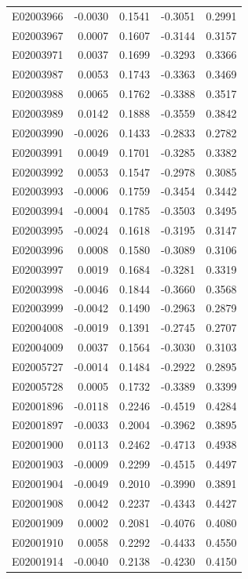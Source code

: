 \documentclass[11pt, a4paper]{article}
\begin{document}
\begin{longtable}{lrrrr}
E02003966 & -0.0030 & 0.1541 & -0.3051 & 0.2991 \\
E02003967 & 0.0007 & 0.1607 & -0.3144 & 0.3157 \\
E02003971 & 0.0037 & 0.1699 & -0.3293 & 0.3366 \\
E02003987 & 0.0053 & 0.1743 & -0.3363 & 0.3469 \\
E02003988 & 0.0065 & 0.1762 & -0.3388 & 0.3517 \\
E02003989 & 0.0142 & 0.1888 & -0.3559 & 0.3842 \\
E02003990 & -0.0026 & 0.1433 & -0.2833 & 0.2782 \\
E02003991 & 0.0049 & 0.1701 & -0.3285 & 0.3382 \\
E02003992 & 0.0053 & 0.1547 & -0.2978 & 0.3085 \\
E02003993 & -0.0006 & 0.1759 & -0.3454 & 0.3442 \\
E02003994 & -0.0004 & 0.1785 & -0.3503 & 0.3495 \\
E02003995 & -0.0024 & 0.1618 & -0.3195 & 0.3147 \\
E02003996 & 0.0008 & 0.1580 & -0.3089 & 0.3106 \\
E02003997 & 0.0019 & 0.1684 & -0.3281 & 0.3319 \\
E02003998 & -0.0046 & 0.1844 & -0.3660 & 0.3568 \\
E02003999 & -0.0042 & 0.1490 & -0.2963 & 0.2879 \\
E02004008 & -0.0019 & 0.1391 & -0.2745 & 0.2707 \\
E02004009 & 0.0037 & 0.1564 & -0.3030 & 0.3103 \\
E02005727 & -0.0014 & 0.1484 & -0.2922 & 0.2895 \\
E02005728 & 0.0005 & 0.1732 & -0.3389 & 0.3399 \\
E02001896 & -0.0118 & 0.2246 & -0.4519 & 0.4284 \\
E02001897 & -0.0033 & 0.2004 & -0.3962 & 0.3895 \\
E02001900 & 0.0113 & 0.2462 & -0.4713 & 0.4938 \\
E02001903 & -0.0009 & 0.2299 & -0.4515 & 0.4497 \\
E02001904 & -0.0049 & 0.2010 & -0.3990 & 0.3891 \\
E02001908 & 0.0042 & 0.2237 & -0.4343 & 0.4427 \\
E02001909 & 0.0002 & 0.2081 & -0.4076 & 0.4080 \\
E02001910 & 0.0058 & 0.2292 & -0.4433 & 0.4550 \\
E02001914 & -0.0040 & 0.2138 & -0.4230 & 0.4150 \\

\end{longtable}
\end{document}
